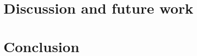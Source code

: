 \documentclass[11pt]{article}
\begin{document}
\section{Discussion and future work}
\section{Conclusion}



\end{document}
